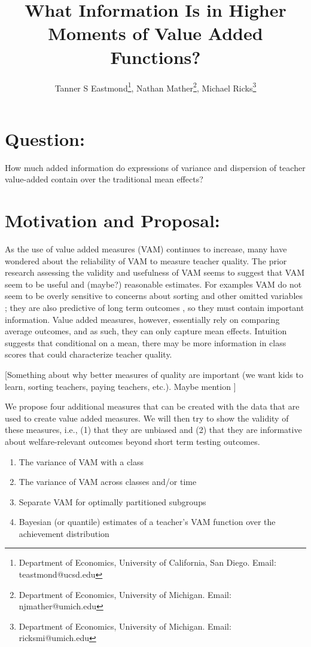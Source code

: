 \documentclass[letterpaper,12pt]{article}
\title{What Information Is in Higher Moments of Value Added Functions?}
\author{Tanner S Eastmond\thanks{Department of Economics, University of California, San Diego. Email: teastmond@ucsd.edu},  Nathan Mather\thanks{Department of Economics, University of Michigan. Email: njmather@umich.edu }, Michael Ricks\thanks{Department of Economics, University of Michigan. Email: ricksmi@umich.edu}}
\date{\vspace{-8ex}}
\begin{document}
\maketitle

\section{Question:} 

How much added information do expressions of variance and dispersion of teacher value-added contain over the traditional mean effects?

\section{Motivation and Proposal:}

As the use of value added measures (VAM) continues to increase, many have wondered about the reliability of VAM to measure teacher quality. 
The prior research assessing the validity and usefulness of VAM seems to suggest that VAM seem to be useful and (maybe?) reasonable estimates. 
For examples VAM do not seem to be overly sensitive to concerns about sorting and other omitted variables \citep{chetty2014measuring1}; they are also predictive of long term outcomes \citep{chetty2014measuring2}, so they must contain important information. 
Value added measures, however, essentially rely on comparing average outcomes, and as such, they can only capture mean effects.
Intuition suggests that conditional on a mean, there may be more information in class scores that could characterize teacher quality.

[Something about why better measures of quality are important (we want kids to learn, sorting teachers, paying teachers, etc.). Maybe mention \citet{michelmore2017gap}]

We propose four additional measures that can be created with the data that are used to create value added measures. We will then try to show the validity of these measures, i.e., (1) that they are unbiased and (2) that they are informative about welfare-relevant outcomes beyond short term testing outcomes.

\begin{enumerate}
    \item The variance of VAM with a class
    \item The variance of VAM across classes and/or time
    \item Separate VAM for optimally partitioned subgroups
    \item Bayesian (or quantile) estimates of a teacher's VAM function over the achievement distribution
\end{enumerate}
\end{document}

